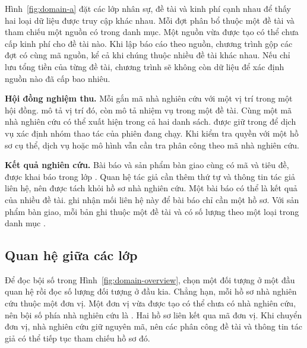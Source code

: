 Hình~\ref{fig:domain-a} đặt các lớp nhân sự, đề tài và kinh phí cạnh nhau để thấy hai loại dữ liệu được truy cập khác nhau. Mỗi đợt phân bổ thuộc một đề tài và tham chiếu một nguồn có trong danh mục. Một nguồn vừa được tạo có thể chưa cấp kinh phí cho đề tài nào. Khi lập báo cáo theo nguồn, chương trình gộp các đợt có cùng mã nguồn, kể cả khi chúng thuộc nhiều đề tài khác nhau. Nếu chỉ lưu tổng tiền của từng đề tài, chương trình sẽ không còn dữ liệu để xác định nguồn nào đã cấp bao nhiêu.


\textbf{Hội đồng nghiệm thu.} Mỗi  gắn mã nhà nghiên cứu với một vị trí trong một hội đồng.  mô tả vị trí đó, còn  mô tả nhiệm vụ trong một đề tài. Cùng một mã nhà nghiên cứu có thể xuất hiện trong cả hai danh sách.  được giữ trong  để dịch vụ xác định nhóm thao tác của phiên đang chạy. Khi kiểm tra quyền với một hồ sơ cụ thể, dịch vụ hoặc mô hình vẫn cần tra phân công theo mã nhà nghiên cứu.

\textbf{Kết quả nghiên cứu.} Bài báo và sản phẩm bàn giao cùng có mã và tiêu đề, được khai báo trong lớp . Quan hệ tác giả cần thêm thứ tự và thông tin tác giả liên hệ, nên  được tách khỏi hồ sơ nhà nghiên cứu. Một bài báo có thể là kết quả của nhiều đề tài.  ghi nhận mối liên hệ này để bài báo chỉ cần một hồ sơ. Với sản phẩm bàn giao, mỗi bản ghi thuộc một đề tài và có số lượng theo một loại trong danh mục .

\subsection{Quan hệ giữa các lớp}\label{sec:uml-relations}

Để đọc bội số trong Hình~\ref{fig:domain-overview}, chọn một đối tượng ở một đầu quan hệ rồi đọc số lượng đối tượng ở đầu kia. Chẳng hạn, mỗi hồ sơ nhà nghiên cứu thuộc một đơn vị. Một đơn vị vừa được tạo có thể chưa có nhà nghiên cứu, nên bội số phía nhà nghiên cứu là . Hai hồ sơ liên kết qua mã đơn vị. Khi chuyển đơn vị, nhà nghiên cứu giữ nguyên mã, nên các phân công đề tài và thông tin tác giả có thể tiếp tục tham chiếu hồ sơ đó.

